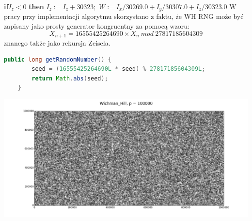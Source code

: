 \documentclass[a4paper, 11pt]{article} %
\begin{document}
\noindent \textbf{if}$I_z < 0$ \textbf{then}
\newline \indent	$I_z := I_z + 30323;$
\noindent \newline $W := I_x/30269.0 + I_y/30307.0 + I_z/30323.0$
\newline W pracy przy implementacji algorytmu skorzystano z faktu, że WH RNG może być zapisany jako prosty generator kongruentny za pomocą wzoru: 
$$X_{n+1} = 16555425264690 \times X_n\ mod\ 27817185604309 $$
znanego także jako rekursja Zeisela.

\begin{lstlisting}[style=mystyle, language=java, frame=single, caption = Generowanie następnej liczby pseudolosowej przez algorytm Wichmanna-Hilla na podstawie rekursji Zeisela.]
    public long getRandomNumber() {
        seed = (16555425264690L * seed) % 27817185604309L;
        return Math.abs(seed);
    }
\end{lstlisting}
\includegraphics[width=\linewidth]{img/wh-1.png}

\end{document}
